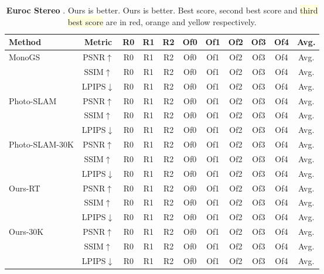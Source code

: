 \begin{table*}
  \centering
  \begin{tabular}{@{}l|cccccccccc@{}} %
    \toprule
    Method & Metric & R0 & R1 & R2 & Of0 & Of1 & Of2 & Of3 & Of4 & Avg.\\
    \midrule %
    \multirow{3}{*}{MonoGS} &  PSNR$\uparrow$   & R0 & R1 & R2 & Of0 & Of1 & Of2 & Of3 & Of4 & Avg. \\
    &SSIM$\uparrow$   & R0 & R1 & R2 & Of0 & Of1 & Of2 & Of3 & Of4 & Avg. \\
    &LPIPS$\downarrow$  & R0 & R1 & R2 & Of0 & Of1 & Of2 & Of3 & Of4 & Avg. \\
     \midrule
    \multirow{3}{*}{Photo-SLAM} &  PSNR$\uparrow$   & R0 & R1 & R2 & Of0 & Of1 & Of2 & Of3 & Of4 & Avg. \\
    &SSIM$\uparrow$   & R0 & R1 & R2 & Of0 & Of1 & Of2 & Of3 & Of4 & Avg. \\
    &LPIPS$\downarrow$  & R0 & R1 & R2 & Of0 & Of1 & Of2 & Of3 & Of4 & Avg. \\
     \midrule
    \multirow{3}{*}{Photo-SLAM-30K} &  PSNR$\uparrow$   & R0 & R1 & R2 & Of0 & Of1 & Of2 & Of3 & Of4 & Avg. \\
    &SSIM$\uparrow$   & R0 & R1 & R2 & Of0 & Of1 & Of2 & Of3 & Of4 & Avg. \\
    &LPIPS$\downarrow$  & R0 & R1 & R2 & Of0 & Of1 & Of2 & Of3 & Of4 & Avg. \\
     \midrule
    \multirow{3}{*}{Ours-RT} &  PSNR$\uparrow$   & R0 & R1 & R2 & Of0 & Of1 & Of2 & Of3 & Of4 & Avg. \\
    &SSIM$\uparrow$   & R0 & R1 & R2 & Of0 & Of1 & Of2 & Of3 & Of4 & Avg. \\
    &LPIPS$\downarrow$  & R0 & R1 & R2 & Of0 & Of1 & Of2 & Of3 & Of4 & Avg. \\
     \midrule
    \multirow{3}{*}{Ours-30K} &  PSNR$\uparrow$   & R0 & R1 & R2 & Of0 & Of1 & Of2 & Of3 & Of4 & Avg. \\
    &SSIM$\uparrow$   & R0 & R1 & R2 & Of0 & Of1 & Of2 & Of3 & Of4 & Avg. \\
    &LPIPS$\downarrow$  & R0 & R1 & R2 & Of0 & Of1 & Of2 & Of3 & Of4 & Avg. \\
    \bottomrule
  \end{tabular}
  \caption{{\bf Euroc Stereo} . Ours is better. Ours is better. \colorbox{lightred}{Best score}, \colorbox{lightorange}{second best score} and \colorbox{lightyellow}{third best score} are in red, orange and yellow respectively.}
  \label{tab:example}
\end{table*}
